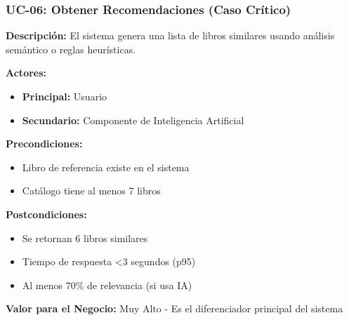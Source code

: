 \documentclass[aspectratio=169]{beamer}
\begin{document}
\begin{frame}
\frametitle{UC-06: Obtener Recomendaciones (Caso Crítico)}

\textbf{Descripción:} El sistema genera una lista de libros similares usando análisis semántico o reglas heurísticas.

\textbf{Actores:}
\begin{itemize}
\item \textbf{Principal:} Usuario
\item \textbf{Secundario:} Componente de Inteligencia Artificial
\end{itemize}

\textbf{Precondiciones:}
\begin{itemize}
\item Libro de referencia existe en el sistema
\item Catálogo tiene al menos 7 libros
\end{itemize}

\textbf{Postcondiciones:}
\begin{itemize}
\item Se retornan 6 libros similares
\item Tiempo de respuesta <3 segundos (p95)
\item Al menos 70\% de relevancia (si usa IA)
\end{itemize}

\vspace{0.3cm}

\begin{tcolorbox}[colback=green!5, colframe=green!50]
\textbf{Valor para el Negocio:} Muy Alto - Es el diferenciador principal del sistema
\end{tcolorbox}

\end{frame}
\end{document}
